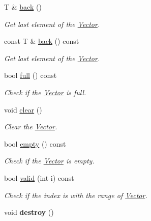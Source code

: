 \begin{DoxyCompactItemize}
\item 
T \& \hyperlink{class_i_dream_sky_1_1_vector_a12b1b598f7e96440dc154413c6dbd2b7}{back} ()
\begin{DoxyCompactList}\small\item\em Get last element of the \hyperlink{class_i_dream_sky_1_1_vector}{Vector}. \end{DoxyCompactList}\item 
const T \& \hyperlink{class_i_dream_sky_1_1_vector_a7502a4ddcb6dfb75dbb8e05948a23392}{back} () const 
\begin{DoxyCompactList}\small\item\em Get last element of the \hyperlink{class_i_dream_sky_1_1_vector}{Vector}. \end{DoxyCompactList}\item 
bool \hyperlink{class_i_dream_sky_1_1_vector_ad61c3b9566674b3abee71fe5e7ca4e12}{full} () const 
\begin{DoxyCompactList}\small\item\em Check if the \hyperlink{class_i_dream_sky_1_1_vector}{Vector} is full. \end{DoxyCompactList}\item 
void \hyperlink{class_i_dream_sky_1_1_vector_a38f9a4d39f1e959701a7c977b3c92365}{clear} ()
\begin{DoxyCompactList}\small\item\em Clear the \hyperlink{class_i_dream_sky_1_1_vector}{Vector}. \end{DoxyCompactList}\item 
bool \hyperlink{class_i_dream_sky_1_1_vector_a84d9249d4a61f7141f1c7391eae15e2c}{empty} () const 
\begin{DoxyCompactList}\small\item\em Check if the \hyperlink{class_i_dream_sky_1_1_vector}{Vector} is empty. \end{DoxyCompactList}\item 
bool \hyperlink{class_i_dream_sky_1_1_vector_affd72df325d6419ffb4f63ad1ac17f53}{valid} (int i) const 
\begin{DoxyCompactList}\small\item\em Check if the index is with the range of \hyperlink{class_i_dream_sky_1_1_vector}{Vector}. \end{DoxyCompactList}\item 
void {\bfseries destroy} ()\hypertarget{class_i_dream_sky_1_1_vector_af0630f0908a8bdf024e8104f7a28526c}{}\label{class_i_dream_sky_1_1_vector_af0630f0908a8bdf024e8104f7a28526c}


\end{DoxyCompactItemize}
